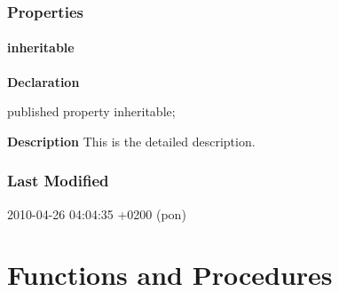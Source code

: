 \documentclass{report}
\begin{document}
\subsubsection*{\large{\textbf{Properties}}\normalsize\hspace{1ex}\hfill}
\paragraph*{inheritable}\hspace*{\fill}

\begin{list}{}{
\setlength{\itemindent}{0cm}
\setlength{\listparindent}{0cm}
\setlength{\leftmargin}{\evensidemargin}
\addtolength{\leftmargin}{\tmplength}
\settowidth{\labelsep}{X}
\addtolength{\leftmargin}{\labelsep}
\setlength{\labelwidth}{\tmplength}
}
\begin{flushleft}
\item[\textbf{Declaration}\hfill]
\begin{ttfamily}
published property inheritable;\end{ttfamily}


\end{flushleft}
\par
\item[\textbf{Description}]
This is the detailed description.

\end{list}
\subsubsection*{\large{\textbf{Last Modified}}\normalsize\hspace{1ex}\hfill}
\par
2010-04-26 04:04:35 +0200 (pon)


\section{Functions and Procedures}
\end{document}
